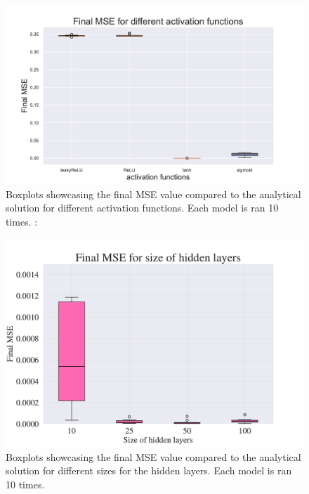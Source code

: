 \begin{figure}[h!]
    \centering
    \includegraphics[width=1.0\linewidth]{project_3/plots/activation_search.pdf}
    \caption{Boxplots showcasing the final MSE value compared to the analytical solution for different activation functions. Each model is ran 10 times. : }
    \label{fig:boxplots_activations}
\end{figure}

\begin{figure}[h!]
    \centering
    \includegraphics[width=1.0\linewidth]{project_3/plots/value_layers_search.pdf}
    \caption{Boxplots showcasing the final MSE value compared to the analytical solution for different sizes for the hidden layers. Each model is ran 10 times. }
    \label{fig:boxplots_size_of_layers}
\end{figure}


